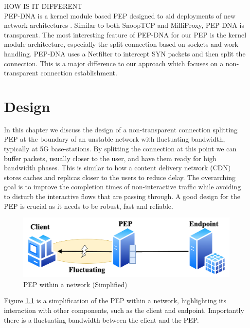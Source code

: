 \documentclass[a4paper,english, 11pt]{report}
\begin{document}
HOW IS IT DIFFERENT\\
PEP-DNA is a kernel module based PEP designed to aid deployments of new network architectures \cite{pep_dna}. Similar to both SnoopTCP and MilliProxy, PEP-DNA is transparent. The most interesting feature of PEP-DNA for our PEP is the kernel module architecture, especially the split connection based on sockets and work handling. PEP-DNA uses a Netfilter to intercept SYN packets and then split the connection. This is a major difference to our approach which focuses on a non-transparent connection establishment.

\chapter{Design} %
In this chapter we discuss the design of a non-transparent connection splitting PEP at the boundary of an unstable network with fluctuating bandwidth, typically at 5G base-stations. By splitting the connection at this point we can buffer packets, usually closer to the user, and have them ready for high bandwidth phases. This is similar to how a content delivery network (CDN) stores caches and replicas closer to the users to reduce delay. The overarching goal is to improve the completion times of non-interactive traffic while avoiding to disturb the interactive flows that are passing through. A good design for the PEP is crucial as it needs to be robust, fast and reliable. \\

\begin{figure} %
	\centering
	\includegraphics[scale=0.45]{../diagrams/drawio/simple_pep_design.png}
  	\caption{PEP within a network (Simplified)}
  	\label{fig:simple_pep_design}
\end{figure}

Figure \ref{fig:simple_pep_design} is a simplification of the PEP within a network, highlighting its interaction with other components, such as the client and endpoint. Importantly there is a fluctuating bandwidth between the client and the PEP.
\end{document}
